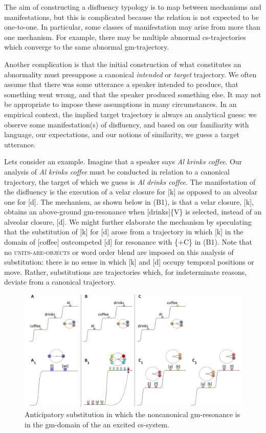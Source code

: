  The aim of constructing a disfluency typology is to map between mechanisms and manifestations, but this is complicated because the relation is not expected to be one-to-one. In particular, some classes of manifestation may arise from more than one mechanism. For example, there may be multiple abnormal cs-trajectories which converge to the same abnormal gm-trajectory. 

  Another complication is that the initial construction of what constitutes an abnormality must presuppose a canonical \textit{intended} or \textit{target} trajectory. We often assume that there was some utterance a speaker intended to produce, that something went wrong, and that the speaker produced something else. It may not be appropriate to impose these assumptions in many circumstances. In an empirical context, the implied target trajectory is always an analytical guess: we observe some manifestation(s) of disfluency, and based on our familiarity with language, our expectations, and our notions of similarity, we guess a target utterance.

  Lets consider an example. Imagine that a speaker says \textit{Al krinks coffee}. Our analysis of \textit{Al krinks coffee} must be conducted in relation to a canonical trajectory, the target of which we guess is \textit{Al drinks coffee}. The manifestation of the disfluency is the execution of a velar closure for [k] as opposed to an alveolar one for [d]. The mechanism, as shown below in (B1), is that a velar closure, [k], obtains an above-ground gm-resonance when [drinks]\{V\} is selected, instead of an alveolar closure, [d]. We might further elaborate the mechanism by speculating that the substitution of [k] for [d] arose from a trajectory in which [k] in the domain of [coffee] outcompeted [d] for resonance with \{+C\} in (B1). Note that no \textsc{units}\textsc{{}-are-}\textsc{objects} or word order blend are imposed on this analysis of substitution: there is no sense in which [k] and [d] occupy temporal positions or move. Rather, substitutions are trajectories which, for indeterminate reasons, deviate from a canonical trajectory. 

  
\begin{figure}
\includegraphics[width=\textwidth]{figures/Tilsen-img58.png}
\caption{Anticipatory substitution in which the noncanonical gm-resonance is in the gm-domain of the an excited cs-system.}
\label{fig:4:8a}
\end{figure}
 

